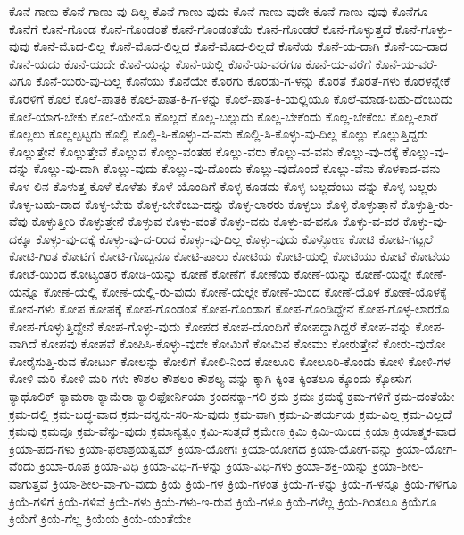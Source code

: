 {ಕೊನೆ-ಗಾಣು
ಕೊನೆ-ಗಾಣು-ವು-ದಿಲ್ಲ
ಕೊನೆ-ಗಾಣು-ವುದು
ಕೊನೆ-ಗಾಣು-ವುದೇ
ಕೊನೆ-ಗಾಣು-ವುವು
ಕೊನೆಗೂ
ಕೊನೆಗೆ
ಕೊನೆ-ಗೊಂಡ
ಕೊನೆ-ಗೊಂಡಂತೆ
ಕೊನೆ-ಗೊಂಡಂತೆಯೆ
ಕೊನೆ-ಗೊಂಡರೆ
ಕೊನೆ-ಗೊಳ್ಳುತ್ತದೆ
ಕೊನೆ-ಗೊಳ್ಳು-ವುವು
ಕೊನೆ-ಮೊದ-ಲಿಲ್ಲ
ಕೊನೆ-ಮೊದ-ಲಿಲ್ಲದ
ಕೊನೆ-ಮೊದ-ಲಿಲ್ಲದೆ
ಕೊನೆಯ
ಕೊನೆ-ಯ-ದಾಗಿ
ಕೊನೆ-ಯ-ದಾದ
ಕೊನೆ-ಯದು
ಕೊನೆ-ಯದೇ
ಕೊನೆ-ಯನ್ನು
ಕೊನೆ-ಯಲ್ಲಿ
ಕೊನೆ-ಯ-ವರೆಗೂ
ಕೊನೆ-ಯ-ವರೆಗೆ
ಕೊನೆ-ಯ-ವರೆ-ವಿಗೂ
ಕೊನೆ-ಯಿರು-ವು-ದಿಲ್ಲ
ಕೊನೆಯು
ಕೊನೆಯೇ
ಕೊರಗು
ಕೊರಡು-ಗ-ಳನ್ನು
ಕೊರತೆ
ಕೊರತೆ-ಗಳು
ಕೊರಳನ್ನೇಕೆ
ಕೊರಳಿಗೆ
ಕೊಲೆ
ಕೊಲೆ-ಪಾತಕಿ
ಕೊಲೆ-ಪಾತ-ಕಿ-ಗ-ಳನ್ನು
ಕೊಲೆ-ಪಾತ-ಕಿ-ಯಲ್ಲಿಯೂ
ಕೊಲೆ-ಮಾಡ-ಬಹು-ದೆಂಬುದು
ಕೊಲೆ-ಯಾಗ-ಬೇಕು
ಕೊಲೆ-ಯೇನೊ
ಕೊಲ್ಲದೆ
ಕೊಲ್ಲ-ಬಲ್ಲುದು
ಕೊಲ್ಲ-ಬೇಕೆಂದು
ಕೊಲ್ಲ-ಬೇಕೆಂಬ
ಕೊಲ್ಲ-ಲಾರೆ
ಕೊಲ್ಲಲು
ಕೊಲ್ಲಲ್ಪಟ್ಟರು
ಕೊಲ್ಲಿ
ಕೊಲ್ಲಿ-ಸಿ-ಕೊಳ್ಳು-ವ-ವನು
ಕೊಲ್ಲಿ-ಸಿ-ಕೊಳ್ಳು-ವು-ದಿಲ್ಲ
ಕೊಲ್ಲು
ಕೊಲ್ಲುತ್ತಿದ್ದರು
ಕೊಲ್ಲುತ್ತೇನೆ
ಕೊಲ್ಲುತ್ತೇವೆ
ಕೊಲ್ಲುವ
ಕೊಲ್ಲು-ವಂತಹ
ಕೊಲ್ಲು-ವರು
ಕೊಲ್ಲು-ವ-ವನು
ಕೊಲ್ಲು-ವು-ದಕ್ಕೆ
ಕೊಲ್ಲು-ವು-ದನ್ನು
ಕೊಲ್ಲು-ವು-ದಾಗಿ
ಕೊಲ್ಲು-ವುದು
ಕೊಲ್ಲು-ವು-ದೊಂದು
ಕೊಲ್ಲು-ವುದೊಂದೆ
ಕೊಲ್ಲು-ವೆನು
ಕೊಳಕಾದ-ವನು
ಕೊಳ-ಲಿನ
ಕೊಳುತ್ತ
ಕೊಳೆ
ಕೊಳೆತು
ಕೊಳೆ-ಯೊಂದಿಗೆ
ಕೊಳ್ಳ-ಕೂಡದು
ಕೊಳ್ಳ-ಬಲ್ಲದೆಂಬು-ದನ್ನು
ಕೊಳ್ಳ-ಬಲ್ಲರು
ಕೊಳ್ಳ-ಬಹು-ದಾದ
ಕೊಳ್ಳ-ಬೇಕು
ಕೊಳ್ಳ-ಬೇಕೆಂಬು-ದನ್ನು
ಕೊಳ್ಳ-ಲಾರರು
ಕೊಳ್ಳಲು
ಕೊಳ್ಳಿ
ಕೊಳ್ಳುತ್ತಾನೆ
ಕೊಳ್ಳುತ್ತಿ-ರು-ವೆವು
ಕೊಳ್ಳುತ್ತೀರಿ
ಕೊಳ್ಳುತ್ತೇನೆ
ಕೊಳ್ಳುವ
ಕೊಳ್ಳು-ವಂತೆ
ಕೊಳ್ಳು-ವನು
ಕೊಳ್ಳು-ವ-ವನೂ
ಕೊಳ್ಳು-ವ-ವರ
ಕೊಳ್ಳು-ವು-ದಕ್ಕೂ
ಕೊಳ್ಳು-ವು-ದಕ್ಕೆ
ಕೊಳ್ಳು-ವು-ದ-ರಿಂದ
ಕೊಳ್ಳು-ವು-ದಿಲ್ಲ
ಕೊಳ್ಳು-ವುದು
ಕೊಳ್ಳೋಣ
ಕೋಟಿ
ಕೋಟಿ-ಗಟ್ಟಲೆ
ಕೋಟಿ-ಗಿಂತ
ಕೋಟಿಗೆ
ಕೋಟಿ-ಗೊಬ್ಬನೂ
ಕೋಟಿ-ಪಾಲು
ಕೋಟಿಯ
ಕೋಟಿ-ಯಲ್ಲಿ
ಕೋಟಿಯು
ಕೋಟೆ
ಕೋಟೆಯ
ಕೋಟೆ-ಯಿಂದ
ಕೋಟ್ಯಂತರ
ಕೋಡಿ-ಯನ್ನು
ಕೋಣೆ
ಕೋಣೆಗೆ
ಕೋಣೆಯ
ಕೋಣೆ-ಯನ್ನು
ಕೋಣೆ-ಯನ್ನೇ
ಕೋಣೆ-ಯನ್ನೊ
ಕೋಣೆ-ಯಲ್ಲಿ
ಕೋಣೆ-ಯಲ್ಲಿ-ರು-ವುದು
ಕೋಣೆ-ಯಲ್ಲೇ
ಕೋಣೆ-ಯಿಂದ
ಕೋಣೆ-ಯೊಳ
ಕೋಣೆ-ಯೊಳಕ್ಕೆ
ಕೋನ-ಗಳು
ಕೋಪ
ಕೋಪಕ್ಕೆ
ಕೋಪ-ಗೊಂಡಂತೆ
ಕೋಪ-ಗೊಂಡಾಗ
ಕೋಪ-ಗೊಂಡಿದ್ದೇನೆ
ಕೋಪ-ಗೊಳ್ಳ-ಲಾರರೊ
ಕೋಪ-ಗೊಳ್ಳುತ್ತಿದ್ದೇನೆ
ಕೋಪ-ಗೊಳ್ಳು-ವುದು
ಕೋಪದ
ಕೋಪ-ದೊಂದಿಗೆ
ಕೋಪದ್ದಾಗಿದ್ದರೆ
ಕೋಪ-ವನ್ನು
ಕೋಪ-ವಾಗಿದೆ
ಕೋಪವು
ಕೋಪವೆ
ಕೋಪಿಸಿ-ಕೊಳ್ಳು-ವುದೇ
ಕೋಮಿಗೆ
ಕೋಮಿನ
ಕೋಮು
ಕೋರುತ್ತೇನೆ
ಕೋರು-ವುದೋ
ಕೋರೈಸುತ್ತಿ-ರುವ
ಕೋರ್ಟು
ಕೋಲನ್ನು
ಕೋಲಿಗೆ
ಕೋಲಿ-ನಿಂದ
ಕೋಲೂರಿ
ಕೋಲೂರಿ-ಕೊಂಡು
ಕೋಳಿ
ಕೋಳಿ-ಗಳ
ಕೋಳಿ-ಮರಿ
ಕೋಳಿ-ಮರಿ-ಗಳು
ಕೌಶಲ
ಕೌಶಲಂ
ಕೌಶಲ್ಯ-ವನ್ನು
ಕ್ಕಾಗಿ
ಕ್ಕಿಂತ
ಕ್ಕಿಂತಲೂ
ಕ್ಕೊಂದು
ಕ್ಕೋಸುಗ
ಕ್ಯಾಥೊಲಿಕ್
ಕ್ಯಾಮರಾ
ಕ್ಯಾಮೆರಾ
ಕ್ಯಾಲಿಫೋರ್ನಿಯಾ
ಕ್ರಂದನಕ್ಕಾ-ಗಲಿ
ಕ್ರಮ
ಕ್ರಮಃ
ಕ್ರಮಕ್ಕೆ
ಕ್ರಮ-ಗಳಿಗೆ
ಕ್ರಮ-ದಂತೆಯೇ
ಕ್ರಮ-ದಲ್ಲಿ
ಕ್ರಮ-ಬದ್ಧ-ವಾದ
ಕ್ರಮ-ವನ್ನನು-ಸರಿ-ಸು-ವುದು
ಕ್ರಮ-ವಾಗಿ
ಕ್ರಮ-ವಿ-ಪರ್ಯಯ
ಕ್ರಮ-ವಿಲ್ಲ
ಕ್ರಮ-ವಿಲ್ಲದೆ
ಕ್ರಮವು
ಕ್ರಮವೂ
ಕ್ರಮ-ವೆನ್ನು-ವುದು
ಕ್ರಮಾನ್ಯತ್ವಂ
ಕ್ರಮಿ-ಸುತ್ತದೆ
ಕ್ರಮೇಣ
ಕ್ರಿಮಿ
ಕ್ರಿಮಿ-ಯಿಂದ
ಕ್ರಿಯಾ
ಕ್ರಿಯಾತ್ಮಕ-ವಾದ
ಕ್ರಿಯಾ-ಪದ-ಗಳು
ಕ್ರಿಯಾ-ಫಲಾಶ್ರಯತ್ವಮ್
ಕ್ರಿಯಾ-ಯೋಗಃ
ಕ್ರಿಯಾ-ಯೋಗದ
ಕ್ರಿಯಾ-ಯೋಗ-ವನ್ನು
ಕ್ರಿಯಾ-ಯೋಗ-ವೆಂದು
ಕ್ರಿಯಾ-ರೂಪ
ಕ್ರಿಯಾ-ವಿಧಿ
ಕ್ರಿಯಾ-ವಿಧಿ-ಗ-ಳನ್ನು
ಕ್ರಿಯಾ-ವಿಧಿ-ಗಳು
ಕ್ರಿಯಾ-ಶಕ್ತಿ-ಯನ್ನು
ಕ್ರಿಯಾ-ಶೀಲ-ವಾಗುತ್ತವೆ
ಕ್ರಿಯಾ-ಶೀಲ-ವಾ-ಗು-ವುದು
ಕ್ರಿಯೆ
ಕ್ರಿಯೆ-ಗಳ
ಕ್ರಿಯೆ-ಗಳಂತೆ
ಕ್ರಿಯೆ-ಗ-ಳನ್ನು
ಕ್ರಿಯೆ-ಗ-ಳನ್ನೂ
ಕ್ರಿಯೆ-ಗಳಿಗೂ
ಕ್ರಿಯೆ-ಗಳಿಗೆ
ಕ್ರಿಯೆ-ಗಳಿವೆ
ಕ್ರಿಯೆ-ಗಳು
ಕ್ರಿಯೆ-ಗಳು-ಇ-ರುವ
ಕ್ರಿಯೆ-ಗಳೂ
ಕ್ರಿಯೆ-ಗಳೆಲ್ಲ
ಕ್ರಿಯೆ-ಗಿಂತಲೂ
ಕ್ರಿಯೆಗೂ
ಕ್ರಿಯೆಗೆ
ಕ್ರಿಯೆ-ಗೆಲ್ಲ
ಕ್ರಿಯೆಯ
ಕ್ರಿಯೆ-ಯಂತೆಯೇ
}
